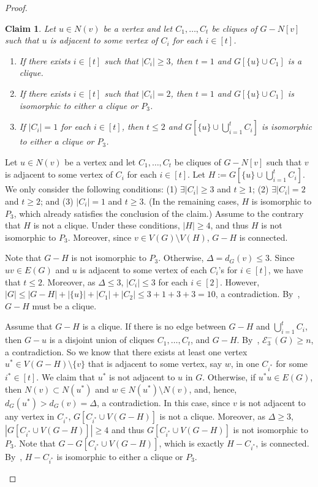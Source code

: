 \documentclass[a4paper,12pt]{article}
\theoremstyle{plain}
\newtheorem{claim}{Claim}[section]
\newenvironment{proof*}{\noindent \emph{Proof of the claim.}}{\hfill$\Diamond$}
\begin{document}
\begin{proof}
\begin{claim}\label{claim:u+C_i}
Let $u\in N(v)$ be a vertex and let $C_1, \ldots, C_t$ be cliques of $G-N[v]$ such that $u$ is adjacent to some vertex of $C_i$ for each $i\in [t]$.
\begin{enumerate}[label=(\arabic*)]
\setlength{\itemsep}{0em}
    \item\label{1-C_i+u} If there exists $i\in [t]$ such that $|C_i|\geq 3$, then $t=1$ and $G[\{u\}\cup C_1]$ is a clique. 
    \item\label{2-C_i+u} If there exists $i\in [t]$ such that $|C_i|=2$, then $t=1$ and $G[\{u\}\cup C_1]$ is isomorphic to either a clique or $P_3$. 
    \item\label{3-C_i+u} If $|C_i|=1$ for each $i\in[t]$, then $t\leq 2$ and $G[\{u\}\cup \bigcup_{i=1}^t C_i]$ is isomorphic to either a clique or $P_3$.
\end{enumerate}
\end{claim}


\begin{proof*}
Let $u\in N(v)$ be a vertex and let $C_1, \ldots, C_t$ be cliques of $G-N[v]$ such that $v$ is adjacent to some vertex of $C_i$ for each $i\in [t]$. Let $H:=G[\{u\}\cup \bigcup_{i=1}^t C_i]$. We only consider the following conditions: (1) $\exists |C_i|\geq 3$ and $t\geq 1$; (2) $\exists |C_i|=2$ and $t\geq 2$; and (3) $|C_i|=1$ and $t\geq 3$. (In the remaining cases, $H$ is isomorphic to $P_3$, which already satisfies the conclusion of the claim.)
Assume to the contrary that $H$ is not a clique. Under these conditions, $|H|\geq 4$, and thus $H$ is not isomorphic to $P_3$. Moreover, since $v\in V(G)\setminus V(H)$, $G-H$ is connected. 

Note that $G-H$ is not isomorphic to $P_3$. Otherwise, $\Delta=d_G(v)\leq 3$. Since $uv\in E(G)$ and $u$ is adjacent to some vertex of each $C_i$'s for $i\in [t]$, we have that $t\leq 2$. Moreover, as $\Delta\leq 3$, 
$|C_i|\leq 3$ for each $i\in [2]$. However, $|G|\leq |G-H|+|\{u\}|+|C_1|+|C_2|\leq 3+1+3+3=10$, a contradiction. By~, $G-H$ must be a clique.


Assume that $G-H$ is a clique. If there is no edge between $G-H$ and $\bigcup_{i=1}^t C_i$, then $G-u$ is a disjoint union of cliques $C_1, \ldots, C_t$, and $G-H$. By~, $\mathcal{E}_3^{-}(G) \geq n$, a contradiction. So we know that there exists at least one vertex $u^*\in V(G-H)\setminus \{v\}$ that is adjacent to some vertex, say $w$, in one $C_{i^*}$ for some $i^*\in [t]$. We claim that $u^*$ is not adjacent to $u$ in $G$. Otherwise, if $u^*u\in E(G)$, then $N(v)\subset N(u^*)$ and $w\in N(u^*)\setminus N(v)$, and, hence, $d_G(u^*)>d_G(v)=\Delta$, a contradiction. In this case, since $v$ is not adjacent to any vertex in $C_{i^*}$, $G[C_{i^*}\cup V(G-H)]$ is not a clique. Moreover, as $\Delta\geq 3$, $|G[C_{i^*}\cup V(G-H)]|\geq 4$ and thus $G[C_{i^*}\cup V(G-H)]$ is not isomorphic to $P_3$. Note that $G-G[C_{i^*}\cup V(G-H)]$, which is exactly $H-C_{i^*}$, is connected. By~, $H-C_{i^*}$ is isomorphic to either a clique or $P_3$. 


\end{proof*}
\end{proof}
\end{document}
